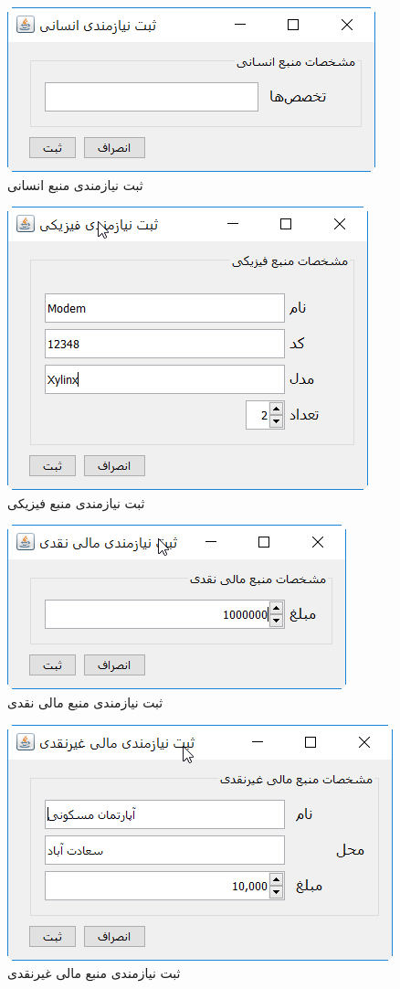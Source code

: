 \begin{figure}[H]
	\centering
	\includegraphics[scale=0.8]{img/prot/AddNewHumanRequirement}
	\caption{ثبت نیازمندی منبع انسانی}
\end{figure}
\begin{figure}[H]
	\centering
	\includegraphics[scale=0.8]{img/prot/AddNewPhysicalRequirement}
	\caption{ثبت نیازمندی منبع فیزیکی}
\end{figure}
\begin{figure}[H]
	\centering
	\includegraphics[scale=0.8]{img/prot/AddNewFinanceRequirement_cach}
	\caption{ثبت نیازمندی منبع مالی نقدی}
\end{figure}
\begin{figure}[H]
	\centering
	\includegraphics[scale=0.8]{img/prot/AddNewFinanceRequirement_nochach}
	\caption{ثبت نیازمندی منبع مالی غیرنقدی}
\end{figure}
